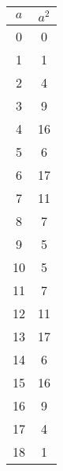 
\begin{table}[H]
\centering
\begin{tabular}{c|c}
$a$ & $a^2$ \\ \hline
0   & 0  \\
1   & 1  \\
2   & 4  \\
3   & 9  \\
4   & 16 \\
5   & 6  \\
6   & 17 \\
7   & 11 \\
8   & 7  \\
9   & 5  \\
10  & 5  \\
11  & 7  \\
12  & 11 \\
13  & 17 \\
14  & 6  \\
15  & 16 \\
16  & 9  \\
17  & 4  \\
18  & 1

\end{tabular}
\end{table}
